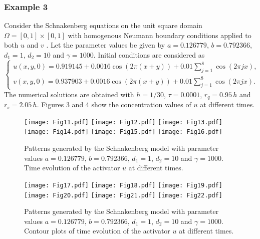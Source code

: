 \documentclass[12pt]{article}
\numberwithin{equation}{section}
\begin{document}
\subsubsection{Example 3}
Consider the Schnakenberg equations on the unit square domain $\Omega  = [0,1] \times [0,1]$ with homogenous Neumann boundary conditions applied to both $u$ and $v$ \cite{Fernandes, Ruuth}. Let the parameter values be given by
$a = 0.126779$, $b = 0.792366$, $d_1=1$,
$d_2=10$ and $\gamma =1000$. Initial conditions are considered as
\[\left\{ \begin{array}{l}
u(x,y,0) = 0.919145 + 0.0016\cos (2\pi (x + y)) + 0.01\sum\limits_{j = 1}^8 {\cos (2\pi jx)} ,\\
v(x,y,0) = 0.937903 + 0.0016\cos (2\pi (x + y)) + 0.01\sum\limits_{j = 1}^8 {\cos (2\pi jx)} .
\end{array} \right.\]
The numerical solutions are obtained with $h=1/30$, $\tau=0.0001$, $r_q=0.95\,h$ and $r_s=2.05\,h$. Figures 3 and 4 show the concentration values of $u$ at different times.
\begin{figure}
\begin{center}
\texttt{[image: Fig11.pdf]}
\texttt{[image: Fig12.pdf]}
\texttt{[image: Fig13.pdf]}
\texttt{[image: Fig14.pdf]}
\texttt{[image: Fig15.pdf]}
\texttt{[image: Fig16.pdf]}
\caption{Patterns generated by the Schnakenberg model with parameter values $a = 0.126779$, $b = 0.792366$, $d_1=1$,
$d_2=10$ and $\gamma = 1000$. Time
evolution of the activator $u$ at different times. }
\end{center}
\end{figure}

\begin{figure}
\begin{center}
\texttt{[image: Fig17.pdf]}
\texttt{[image: Fig18.pdf]}
\texttt{[image: Fig19.pdf]}
\texttt{[image: Fig20.pdf]}
\texttt{[image: Fig21.pdf]}
\texttt{[image: Fig22.pdf]}
\caption{Patterns generated by the Schnakenberg model with parameter values $a = 0.126779$, $b = 0.792366$, $d_1=1$,
$d_2=10$ and $\gamma = 1000$. Contour plots of time
evolution of the activator $u$ at different times. }
\end{center}
\end{figure}
\end{document}
